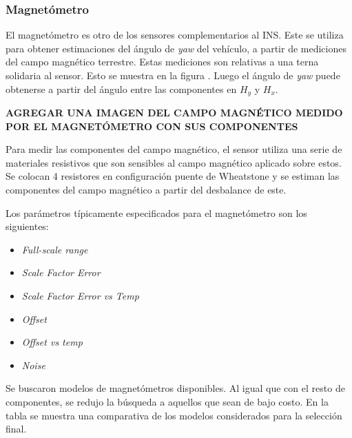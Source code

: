 \subsubsection{Magnetómetro}

El magnetómetro es otro de los sensores complementarios al INS. Este se utiliza para obtener estimaciones del ángulo de \textit{yaw} del vehículo, a partir de mediciones del campo magnético terrestre. Estas mediciones son relativas a una terna solidaria al sensor. Esto se muestra en la figura  . Luego el ángulo de \textit{yaw} puede obtenerse a partir del ángulo entre las componentes en $H_y$ y $H_x$.

\textbf{{\color{red} AGREGAR UNA IMAGEN DEL CAMPO MAGNÉTICO MEDIDO POR EL MAGNETÓMETRO CON SUS COMPONENTES}}

Para medir las componentes del campo magnético, el sensor utiliza una serie de materiales resistivos que son sensibles al campo magnético aplicado sobre estos. Se colocan 4 resistores en configuración puente de Wheatstone y se estiman las componentes del campo magnético a partir del desbalance de este.

Los parámetros típicamente especificados para el magnetómetro son los siguientes:

\begin{itemize}
    \item \textit{Full-scale range}
    \item \textit{Scale Factor Error}
    \item \textit{Scale Factor Error vs Temp}
    \item \textit{Offset}
    \item \textit{Offset vs temp}
    \item \textit{Noise}
\end{itemize}

Se buscaron modelos de magnetómetros disponibles. Al igual que con el resto de componentes, se redujo la búsqueda a aquellos que sean de bajo costo. En la tabla  se muestra una comparativa de los modelos considerados para la selección final.

